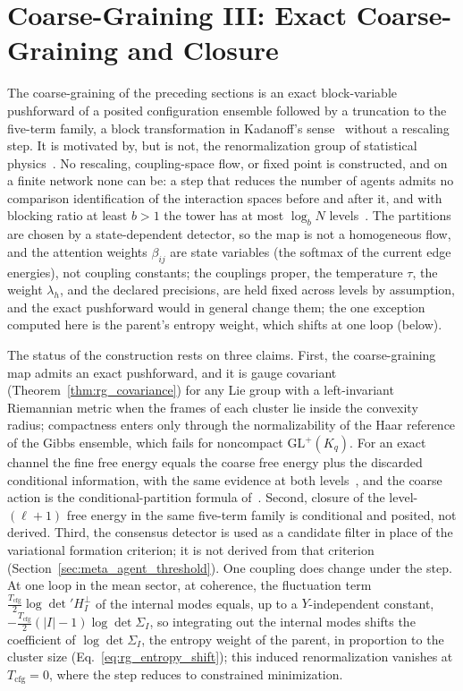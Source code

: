 \section{Coarse-Graining III: Exact Coarse-Graining and Closure}\label{sec:rg_status}

The coarse-graining of the preceding sections is an exact block-variable pushforward of a posited configuration ensemble followed by a truncation to the five-term family, a block transformation in Kadanoff's sense~\cite{kadanoff1966scaling} without a rescaling step. It is motivated by, but is not, the renormalization group of statistical physics~\cite{Wilson1971, Wilson1974, Cardy1996}. No rescaling, coupling-space flow, or fixed point is constructed, and on a finite network none can be: a step that reduces the number of agents admits no comparison identification of the interaction spaces before and after it, and with blocking ratio at least $b > 1$ the tower has at most $\log_b N$ levels~\cite[Ch.~11, the finite-network obstruction proposition]{DennisGaugeVFE2026}. The partitions are chosen by a state-dependent detector, so the map is not a homogeneous flow, and the attention weights $\beta_{ij}$ are state variables (the softmax of the current edge energies), not coupling constants; the couplings proper, the temperature $\tau$, the weight $\lambda_h$, and the declared precisions, are held fixed across levels by assumption, and the exact pushforward would in general change them; the one exception computed here is the parent's entropy weight, which shifts at one loop (below).

The status of the construction rests on three claims. First, the coarse-graining map admits an exact pushforward, and it is gauge covariant (Theorem~\ref{thm:rg_covariance}) for any Lie group with a left-invariant Riemannian metric when the frames of each cluster lie inside the convexity radius; compactness enters only through the normalizability of the Haar reference of the Gibbs ensemble, which fails for noncompact $\mathrm{GL}^+(K_q)$. For an exact channel the fine free energy equals the coarse free energy plus the discarded conditional information, with the same evidence at both levels~\cite[Ch.~9, the exact coarse free-energy theorem]{DennisGaugeVFE2026}, and the coarse action is the conditional-partition formula of~\cite[Ch.~11]{DennisGaugeVFE2026}. Second, closure of the level-$(\ell+1)$ free energy in the same five-term family is conditional and posited, not derived. Third, the consensus detector is used as a candidate filter in place of the variational formation criterion; it is not derived from that criterion (Section~\ref{sec:meta_agent_threshold}). One coupling does change under the step. At one loop in the mean sector, at coherence, the fluctuation term $\tfrac{T_{\mathrm{cfg}}}{2}\log\det' H_I^{\perp}$ of the internal modes equals, up to a $Y$-independent constant, $-\tfrac{T_{\mathrm{cfg}}}{2}(|I|-1)\log\det\Sigma_I$, so integrating out the internal modes shifts the coefficient of $\log\det\Sigma_I$, the entropy weight of the parent, in proportion to the cluster size (Eq.~\eqref{eq:rg_entropy_shift}); this induced renormalization vanishes at $T_{\mathrm{cfg}} = 0$, where the step reduces to constrained minimization.

